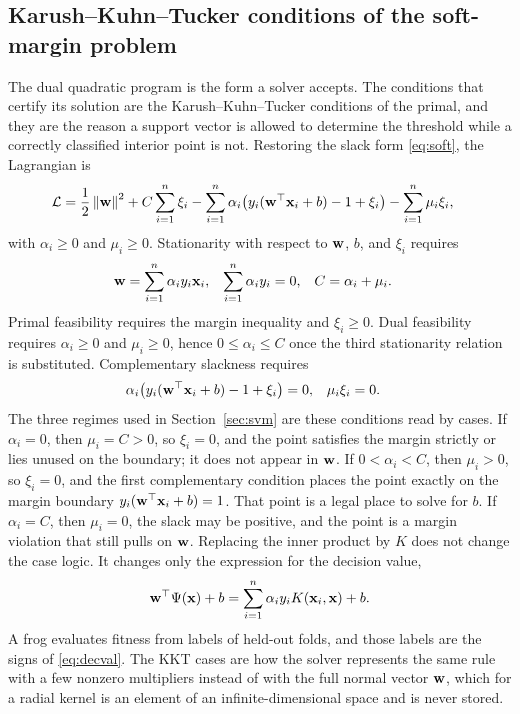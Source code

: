 \subsection{Karush--Kuhn--Tucker conditions of the soft-margin problem}
\label{sec:kkt}

The dual quadratic program is the form a solver accepts.
The conditions that certify its solution are the Karush--Kuhn--Tucker conditions of the primal, and they are the reason a support vector is allowed to determine the threshold while a correctly classified interior point is not.
Restoring the slack form \eqref{eq:soft}, the Lagrangian is
\begin{equation}
\begin{aligned}
\mathcal{L}
&=\frac12\left\lVert \mathbf{w} \right\rVert^{2}+C\sum_{i=1}^{n}\xi_{i}
-\sum_{i=1}^{n}\alpha_{i}\bigl(y_{i}(\mathbf{w}^{\top}\mathbf{x}_{i}+b)-1+\xi_{i}\bigr)
-\sum_{i=1}^{n}\mu_{i}\xi_{i},
\end{aligned}
\label{eq:lag}
\end{equation}
with \(\alpha_{i}\ge 0\) and \(\mu_{i}\ge 0\).
Stationarity with respect to \(\mathbf{w}\), \(b\), and \(\xi_{i}\) requires
\begin{align}
\mathbf{w}&=\sum_{i=1}^{n}\alpha_{i} y_{i}\mathbf{x}_{i},&
\sum_{i=1}^{n}\alpha_{i} y_{i}&=0,&
C&=\alpha_{i}+\mu_{i}.
\label{eq:stat}
\end{align}
Primal feasibility requires the margin inequality and \(\xi_{i}\ge 0\).
Dual feasibility requires \(\alpha_{i}\ge 0\) and \(\mu_{i}\ge 0\), hence \(0\le\alpha_{i}\le C\) once the third stationarity relation is substituted.
Complementary slackness requires
\begin{align}
\alpha_{i}\bigl(y_{i}(\mathbf{w}^{\top}\mathbf{x}_{i}+b)-1+\xi_{i}\bigr)&=0,&
\mu_{i}\xi_{i}&=0.
\label{eq:comp}
\end{align}
The three regimes used in Section~\ref{sec:svm} are these conditions read by cases.
If \(\alpha_{i}=0\), then \(\mu_{i}=C>0\), so \(\xi_{i}=0\), and the point satisfies the margin strictly or lies unused on the boundary; it does not appear in \(\mathbf{w}\).
If \(0<\alpha_{i}<C\), then \(\mu_{i}>0\), so \(\xi_{i}=0\), and the first complementary condition places the point exactly on the margin boundary \(y_{i}(\mathbf{w}^{\top}\mathbf{x}_{i}+b)=1\).
That point is a legal place to solve for \(b\).
If \(\alpha_{i}=C\), then \(\mu_{i}=0\), the slack may be positive, and the point is a margin violation that still pulls on \(\mathbf{w}\).
Replacing the inner product by \(K\) does not change the case logic.
It changes only the expression for the decision value,
\begin{equation}
\mathbf{w}^{\top}\Psi(\mathbf{x})+b
=\sum_{i=1}^{n}\alpha_{i} y_{i} K(\mathbf{x}_{i}, \mathbf{x})+b.
\label{eq:decval}
\end{equation}
A frog evaluates fitness from labels of held-out folds, and those labels are the signs of \eqref{eq:decval}.
The KKT cases are how the solver represents the same rule with a few nonzero multipliers instead of with the full normal vector \(\mathbf{w}\), which for a radial kernel is an element of an infinite-dimensional space and is never stored.

